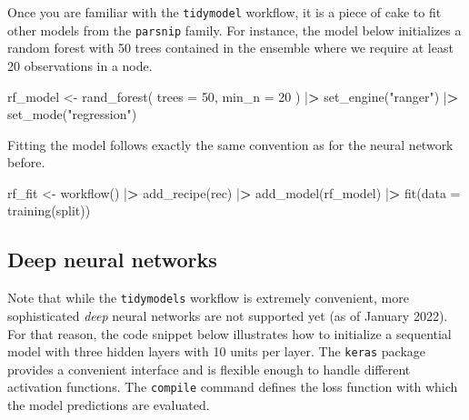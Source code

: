 \documentclass[
]{krantz}
\newenvironment{Shaded}{\begin{snugshade}}{\end{snugshade}}
\newcommand{\AttributeTok}[1]{\textcolor[rgb]{0.61,0.61,0.61}{#1}}
\newcommand{\DecValTok}[1]{\textcolor[rgb]{0.06,0.06,0.06}{#1}}
\newcommand{\ErrorTok}[1]{\textcolor[rgb]{0.14,0.14,0.14}{\textbf{#1}}}
\newcommand{\FunctionTok}[1]{\textcolor[rgb]{0,0,0}{#1}}
\newcommand{\NormalTok}[1]{#1}
\newcommand{\OtherTok}[1]{\textcolor[rgb]{0.37,0.37,0.37}{#1}}
\newcommand{\SpecialCharTok}[1]{\textcolor[rgb]{0,0,0}{#1}}
\newcommand{\StringTok}[1]{\textcolor[rgb]{0.5,0.5,0.5}{#1}}
\begin{document}
Once you are familiar with the \texttt{tidymodel} workflow, it is a piece of cake to fit other models from the \texttt{parsnip} family. For instance, the model below initializes a random forest with 50 trees contained in the ensemble where we require at least 20 observations in a node.

\begin{Shaded}
\begin{Highlighting}[]
\NormalTok{rf\_model }\OtherTok{\textless{}{-}} \FunctionTok{rand\_forest}\NormalTok{(}
  \AttributeTok{trees =} \DecValTok{50}\NormalTok{,}
  \AttributeTok{min\_n =} \DecValTok{20}
\NormalTok{) }\SpecialCharTok{|}\ErrorTok{\textgreater{}}
  \FunctionTok{set\_engine}\NormalTok{(}\StringTok{"ranger"}\NormalTok{) }\SpecialCharTok{|}\ErrorTok{\textgreater{}}
  \FunctionTok{set\_mode}\NormalTok{(}\StringTok{"regression"}\NormalTok{)}
\end{Highlighting}
\end{Shaded}

Fitting the model follows exactly the same convention as for the neural network before.

\begin{Shaded}
\begin{Highlighting}[]
\NormalTok{rf\_fit }\OtherTok{\textless{}{-}} \FunctionTok{workflow}\NormalTok{() }\SpecialCharTok{|}\ErrorTok{\textgreater{}}
  \FunctionTok{add\_recipe}\NormalTok{(rec) }\SpecialCharTok{|}\ErrorTok{\textgreater{}}
  \FunctionTok{add\_model}\NormalTok{(rf\_model) }\SpecialCharTok{|}\ErrorTok{\textgreater{}}
  \FunctionTok{fit}\NormalTok{(}\AttributeTok{data =} \FunctionTok{training}\NormalTok{(split))}
\end{Highlighting}
\end{Shaded}

\hypertarget{deep-neural-networks}{%
\subsection{Deep neural networks}\label{deep-neural-networks}}

Note that while the \texttt{tidymodels} workflow is extremely convenient, more sophisticated \emph{deep} neural networks are not supported yet (as of January 2022). For that reason, the code snippet below illustrates how to initialize a sequential model with three hidden layers with 10 units per layer. The \texttt{keras} package provides a convenient interface and is flexible enough to handle different activation functions. The \texttt{compile} command defines the loss function with which the model predictions are evaluated.
\end{document}
